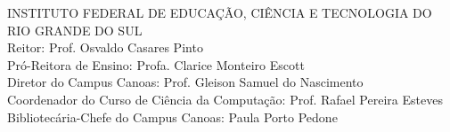 %
%

\thispagestyle{empty}
\vspace*{\fill}

 \begin{flushleft}
\small \setlength{\baselineskip}{0.8\baselineskip}INSTITUTO FEDERAL DE EDUCAÇÃO, CIÊNCIA E TECNOLOGIA DO RIO GRANDE DO SUL\\
Reitor: Prof. Osvaldo Casares Pinto\\
Pró-Reitora de Ensino: Profa. Clarice Monteiro Escott\\
Diretor do Campus Canoas: Prof. Gleison Samuel do Nascimento\\
Coordenador do Curso de Ciência da Computação: Prof. Rafael Pereira Esteves\\
Bibliotecária-Chefe do Campus Canoas: Paula Porto Pedone\\
\end{flushleft}
